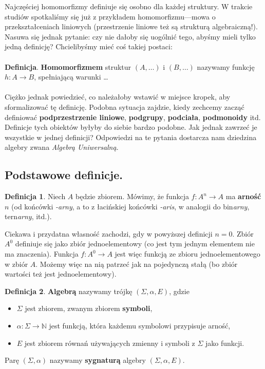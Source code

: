 \documentclass{article}
\theoremstyle{definition}
\newtheorem{definition}{Definicja}[section]
\begin{document}
Najczęściej homomorfizmy definiuje się osobno dla każdej struktury.
W trakcie studiów spotkaliśmy się już z przykładem homomorfizmu---mowa o przekształceniach liniowych
	(przestrzenie liniowe też są strukturą algebraiczną!).
Nasuwa się jednak pytanie: czy nie dałoby się uogólnić tego,
	abyśmy mieli tylko jedną definicję?
Chcielibyśmy mieć coś takiej postaci:
\\\\
\noindent \textbf{Definicja}.
	\textbf{Homomorfizmem} struktur $(A, \dots)$ i $(B, \dots)$ nazywamy funkcję $h: A \to B$,
	spełniającą warunki \dots
\\\\
Ciężko jednak powiedzieć, co należałoby wstawić w miejsce kropek, aby sformalizować tę definicję.
Podobna sytuacja zajdzie,
    kiedy zechcemy zacząć definiować
	\textbf{podprzestrzenie liniowe}, \textbf{podgrupy}, \textbf{podciała}, \textbf{podmonoidy} itd.
Definicje tych obiektów byłyby do siebie bardzo podobne.
Jak jednak zawrzeć je wszystkie w jednej definicji?
Odpowiedzi na te pytania dostarcza nam dziedzina algebry zwana \textit{Algebrą Uniwersalną}.

\subsection{Podstawowe definicje.}

\begin{definition}
	Niech $A$ będzie zbiorem.
	Mówimy, że funkcja $f: A^n \to A$ ma \textbf{arność} $n$ (od końcówki \textit{-arny},
	a to z łacińskiej końcówki \textit{-aris},
	w analogii do bin\textit{arny}, tern\textit{arny}, itd.).
\end{definition}

Ciekawa i przydatna własność zachodzi, gdy w powyższej definicji $n = 0$.
Zbiór $A^0$ definiuje się jako zbiór jednoelementowy (co jest tym jednym elementem nie ma znaczenia).
Funkcja $f:A^0 \to A$ jest więc funkcją ze zbioru jednoelementowego w zbiór $A$.
Możemy więc na nią patrzeć jak na pojedynczą stałą (bo zbiór wartości też jest jednoelementowy).

\begin{definition}
	\textbf{Algebrą} nazywamy trójkę $(\Sigma, \alpha, E)$,
	gdzie
	\begin{itemize}
		\item $\Sigma$ jest zbiorem, zwanym zbiorem \textbf{symboli},
		\item $\alpha: \Sigma \to \mathbb{N}$ jest funkcją, która każdemu symbolowi przypisuje arność,
		\item $E$ jest zbiorem równań używających zmienny i symboli z $\Sigma$ jako funkcji.
	\end{itemize}
	Parę $(\Sigma, \alpha)$ nazywamy \textbf{sygnaturą} algebry $(\Sigma, \alpha, E)$.
\end{definition}
\end{document}
